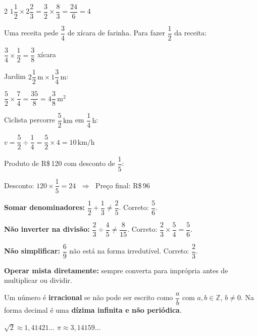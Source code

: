 \documentclass[12pt,twoside]{article}
\begin{document}
\begin{multicols}{2}
$1\dfrac{1}{2} \times 2\dfrac{2}{3} = \dfrac{3}{2} \times \dfrac{8}{3} = \dfrac{24}{6} = 4$ \checkmark



Uma receita pede $\dfrac{3}{4}$ de xícara de farinha. Para fazer $\dfrac{1}{2}$ da receita:

$\dfrac{3}{4} \times \dfrac{1}{2} = \dfrac{3}{8}$ xícara \checkmark


Jardim $2\dfrac{1}{2}\,\text{m} \times 1\dfrac{3}{4}\,\text{m}$:

$\dfrac{5}{2} \times \dfrac{7}{4} = \dfrac{35}{8} = 4\dfrac{3}{8}\,\text{m}^2$ \checkmark


Ciclista percorre $\dfrac{5}{2}\,\text{km}$ em $\dfrac{1}{4}\,\text{h}$:

$v = \dfrac{5}{2} \div \dfrac{1}{4} = \dfrac{5}{2} \times 4 = 10\,\text{km/h}$ \checkmark


Produto de R\$\,120 com desconto de $\dfrac{1}{5}$:

Desconto: $120 \times \dfrac{1}{5} = 24$ $\;\Rightarrow\;$ Preço final: R\$\,96 \checkmark


\textbf{Somar denominadores:} $\dfrac{1}{2}+\dfrac{1}{3} \neq \dfrac{2}{5}$. Correto: $\dfrac{5}{6}$.

\textbf{Não inverter na divisão:} $\dfrac{2}{3}\div\dfrac{4}{5} \neq \dfrac{8}{15}$. Correto: $\dfrac{2}{3}\times\dfrac{5}{4}=\dfrac{5}{6}$.

\textbf{Não simplificar:} $\dfrac{6}{9}$ não está na forma irredutível. Correto: $\dfrac{2}{3}$.

\textbf{Operar mista diretamente:} sempre converta para imprópria antes de multiplicar ou dividir.


Um número é \textbf{irracional} se não pode ser escrito como $\dfrac{a}{b}$ com $a, b \in \mathbb{Z}$,
$b \neq 0$. Na forma decimal é uma \textbf{dízima infinita e não periódica}.


$\sqrt{2} \approx 1{,}41421\ldots$ \quad $\pi \approx 3{,}14159\ldots$


\end{multicols}
\end{document}
